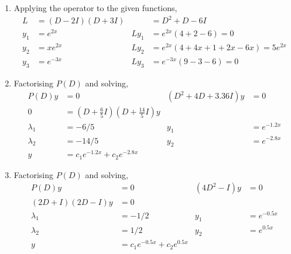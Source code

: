 \begin{enumerate}
    \item Applying the operator to the given functions,
          \begin{align}
              L      & = (D - 2I)(D + 3I)                       &
                     & = D^{2} + D - 6I                           \\
              y_{1}  & = e^{2x}                                 &
              Ly_{1} & = e^{2x} (4 + 2 - 6) = 0                   \\
              y_{2}  & = xe^{2x}                                &
              Ly_{2} & = e^{2x}(4 + 4x + 1 + 2x - 6x) = 5e^{2x}   \\
              y_{3}  & = e^{-3x}                                &
              Ly_{3} & = e^{-3x}(9 - 3 - 6) = 0
          \end{align}

    \item Factorising $ P(D) $ and solving,
          \begin{align}
              P(D)y                 & = 0                               &
              (D^{2} + 4D + 3.36I)y & = 0                                 \\
              0                     & = \left( D + \frac{6}{5}I \right)
              \left( D + \frac{14}{5}I \right)y                           \\
              \lambda_{1}           & = -6/5                            &
              y_{1}                 & = e^{-1.2x}                         \\
              \lambda_{2}           & = -14/5                           &
              y_{2}                 & = e^{-2.8x}                         \\
              y                     & = c_{1}e^{-1.2x} + c_{2}e^{-2.8x}
          \end{align}

    \item Factorising $ P(D) $ and solving,
          \begin{align}
              P(D)y                                       & = 0              &
              (4D^{2} - I)y                               & = 0                \\
              \left( 2D + I \right)\left( 2D - I \right)y & = 0                \\
              \lambda_{1}                                 & = -1/2           &
              y_{1}                                       & = e^{-0.5x}        \\
              \lambda_{2}                                 & = 1/2            &
              y_{2}                                       & = e^{0.5x}         \\
              y                                           & = c_{1}e^{-0.5x}
              + c_{2}e^{0.5x}
          \end{align}


\end{enumerate}

